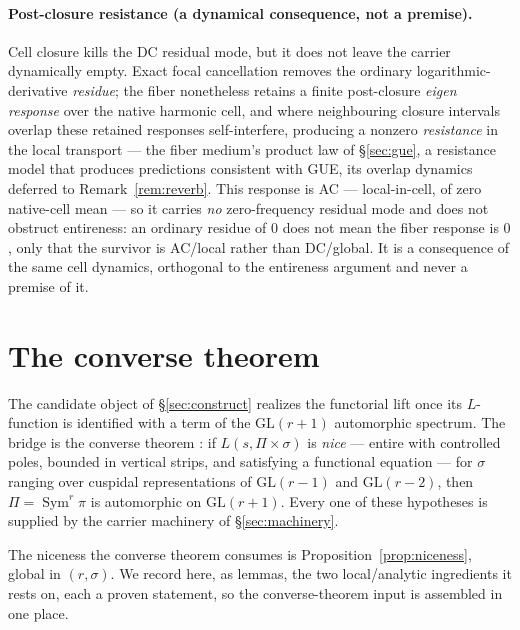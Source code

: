 \documentclass[11pt]{article}
\theoremstyle{definition}
\newcommand{\Sym}{\operatorname{Sym}}
\begin{document}
\paragraph{Post-closure resistance (a dynamical consequence, not a premise).} Cell closure kills the DC
residual mode, but it does not leave the carrier dynamically empty. Exact focal cancellation removes the
ordinary logarithmic-derivative \emph{residue}; the fiber nonetheless retains a finite post-closure
\emph{eigen response} over the native harmonic cell, and where neighbouring closure intervals overlap these
retained responses self-interfere, producing a nonzero \emph{resistance} in the local transport --- the
fiber medium's product law of \S\ref{sec:gue}, a resistance model that produces predictions consistent with
GUE, its overlap dynamics deferred to Remark~\ref{rem:reverb}. This response is AC --- local-in-cell, of
zero native-cell mean --- so it carries
\emph{no} zero-frequency residual mode and does not obstruct entireness: an ordinary residue of $0$ does not
mean the fiber response is $0$, only that the survivor is AC/local rather than DC/global. It is a
consequence of the same cell dynamics, orthogonal to the entireness argument and never a premise of it.

\section{The converse theorem}\label{sec:converse}

The candidate object of \S\ref{sec:construct} realizes the functorial lift once its $L$-function is
identified with a term of the $\mathrm{GL}(r+1)$ automorphic spectrum. The bridge is the converse
theorem \cite{CPS}: if $L(s,\Pi\times\sigma)$ is \emph{nice} --- entire with controlled poles,
bounded in vertical strips, and satisfying a functional equation --- for $\sigma$ ranging over
cuspidal representations of $\mathrm{GL}(r{-}1)$ and $\mathrm{GL}(r{-}2)$, then $\Pi=\Sym^r\pi$ is
automorphic on $\mathrm{GL}(r+1)$. Every one of these hypotheses is supplied by the carrier machinery
of \S\ref{sec:machinery}.

The niceness the converse theorem consumes is Proposition~\ref{prop:niceness}, global in $(r,\sigma)$.
We record here, as lemmas, the two local/analytic ingredients it rests on, each a proven statement, so
the converse-theorem input is assembled in one place.
\end{document}
